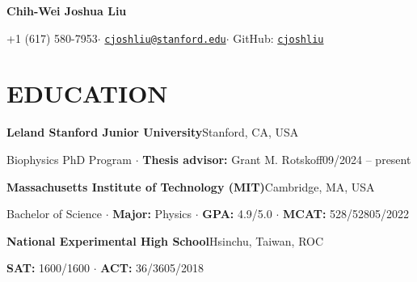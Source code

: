 \documentclass[11pt,letterpaper]{article}
\newcommand{\entry}[2]{\textbf{#1}\hfill #2\par}
\begin{document}
\fontsize{10.5}{12}\selectfont
\begin{center}
{\fontsize{18}{22}\selectfont\bfseries Chih-Wei Joshua Liu}\par
\vspace{4pt}
+1 (617) 580-7953\enspace$\cdot$\enspace
\href{mailto:cjoshliu@stanford.edu}{\texttt{cjoshliu@stanford.edu}}\enspace$\cdot$\enspace
GitHub: \href{https://github.com/cjoshliu}{\texttt{cjoshliu}}
\end{center}
\vspace{-14pt}

\section{EDUCATION}
\entry{Leland Stanford Junior University}{Stanford, CA, USA}
Biophysics PhD Program $\cdot$ \textbf{Thesis advisor:} Grant M. Rotskoff\hfill 09/2024 -- present\par
\vspace{4pt}
\entry{Massachusetts Institute of Technology (MIT)}{Cambridge, MA, USA}
Bachelor of Science $\cdot$ \textbf{Major:} Physics $\cdot$ \textbf{GPA:} 4.9/5.0 $\cdot$ \textbf{MCAT:} 528/528\hfill 05/2022\par
\vspace{4pt}
\entry{National Experimental High School}{Hsinchu, Taiwan, ROC}
\textbf{SAT:} 1600/1600 $\cdot$ \textbf{ACT:} 36/36\hfill 05/2018
\end{document}
